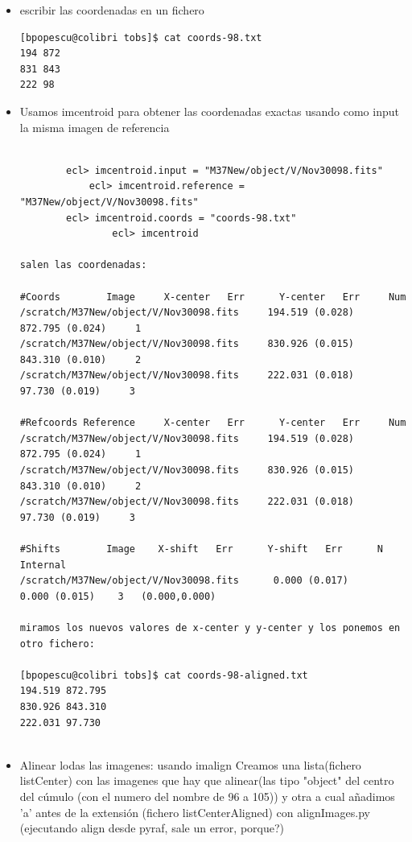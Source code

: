 \documentclass{article}
\begin{document}
\begin{itemize}
\item  escribir las coordenadas en un fichero
\begin{verbatim}
[bpopescu@colibri tobs]$ cat coords-98.txt
194 872
831 843
222 98
\end{verbatim}

\item Usamos imcentroid para obtener las coordenadas exactas usando como input la misma imagen de referencia

\begin{verbatim}

        ecl> imcentroid.input = "M37New/object/V/Nov30098.fits" 
	    	ecl> imcentroid.reference = "M37New/object/V/Nov30098.fits" 
       	ecl> imcentroid.coords = "coords-98.txt"
				ecl> imcentroid

salen las coordenadas:

#Coords        Image     X-center   Err      Y-center   Err     Num
/scratch/M37New/object/V/Nov30098.fits     194.519 (0.028)     872.795 (0.024)     1
/scratch/M37New/object/V/Nov30098.fits     830.926 (0.015)     843.310 (0.010)     2
/scratch/M37New/object/V/Nov30098.fits     222.031 (0.018)      97.730 (0.019)     3

#Refcoords Reference     X-center   Err      Y-center   Err     Num
/scratch/M37New/object/V/Nov30098.fits     194.519 (0.028)     872.795 (0.024)     1
/scratch/M37New/object/V/Nov30098.fits     830.926 (0.015)     843.310 (0.010)     2
/scratch/M37New/object/V/Nov30098.fits     222.031 (0.018)      97.730 (0.019)     3

#Shifts        Image    X-shift   Err      Y-shift   Err      N      Internal
/scratch/M37New/object/V/Nov30098.fits      0.000 (0.017)      0.000 (0.015)    3   (0.000,0.000)

miramos los nuevos valores de x-center y y-center y los ponemos en otro fichero:

[bpopescu@colibri tobs]$ cat coords-98-aligned.txt 
194.519 872.795
830.926 843.310
222.031 97.730


\end{verbatim}

\item Alinear lodas las imagenes: usando imalign
Creamos una lista(fichero listCenter) con las imagenes  que hay que alinear(las tipo "object" del centro del cúmulo (con el numero del nombre  de 96 a 105)) y otra a cual añadimos 'a' antes de la extensión (fichero listCenterAligned) con alignImages.py (ejecutando align desde pyraf, sale un error, porque?)


\end{itemize}
\end{document}
